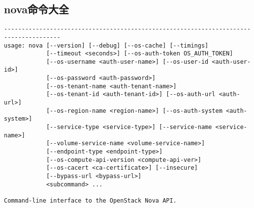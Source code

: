 \documentclass[a4paper,left=1.5cm,right=1.5cm,11pt]{article}
\begin{document}
\subsection{nova命令大全}
\begin{lstlisting}
--------------------------------------------------------------------------------------
usage: nova [--version] [--debug] [--os-cache] [--timings]
            [--timeout <seconds>] [--os-auth-token OS_AUTH_TOKEN]
            [--os-username <auth-user-name>] [--os-user-id <auth-user-id>]
            [--os-password <auth-password>]
            [--os-tenant-name <auth-tenant-name>]
            [--os-tenant-id <auth-tenant-id>] [--os-auth-url <auth-url>]
            [--os-region-name <region-name>] [--os-auth-system <auth-system>]
            [--service-type <service-type>] [--service-name <service-name>]
            [--volume-service-name <volume-service-name>]
            [--endpoint-type <endpoint-type>]
            [--os-compute-api-version <compute-api-ver>]
            [--os-cacert <ca-certificate>] [--insecure]
            [--bypass-url <bypass-url>]
            <subcommand> ...

Command-line interface to the OpenStack Nova API.


\end{lstlisting}
\end{document}
